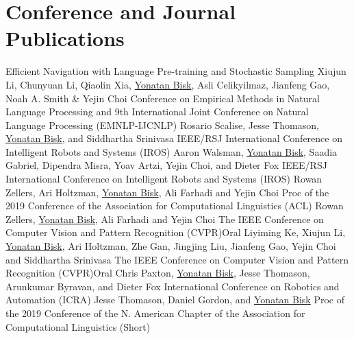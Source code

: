 \documentclass[10pt,letter]{moderncv}
\newcommand{\YB}{\underline{Yonatan Bisk}}
\begin{document}
\section{Conference and Journal Publications}
  {Efficient Navigation with Language Pre-training and Stochastic Sampling}
  {Xiujun Li, Chunyuan Li, Qiaolin Xia, \YB{}, Asli Celikyilmaz, Jianfeng Gao, Noah A. Smith \& Yejin Choi}
  {Conference on Empirical Methods in Natural Language Processing and 9th International Joint Conference on Natural Language Processing (EMNLP-IJCNLP)}{}{}
\pub{--}
  {\href{https://arxiv.org/abs/1904.01650}{\color{linkcolor}{Improving Robot Success Detection using Static Object Data}}}
  {Rosario Scalise, Jesse Thomason, \YB{}, and Siddhartha Srinivasa}
  {IEEE/RSJ International Conference on Intelligent Robots and Systems (IROS)}{}{}
\pub{--}
  {\href{https://arxiv.org/abs/1811.08824}{\color{linkcolor}{Early Fusion for Goal Directed Robotic Vision}}}
  {Aaron Walsman, \YB{}, Saadia Gabriel, Dipendra Misra, Yoav Artzi, Yejin Choi, and Dieter Fox}
  {IEEE/RSJ International Conference on Intelligent Robots and Systems (IROS)}{}{}
\pub{--}
  {\href{https://arxiv.org/abs/1905.07830}{\color{linkcolor}{HellaSwag: Can a Machine Really Finish Your Sentence?}}}
  {Rowan Zellers, Ari Holtzman, \YB{}, Ali Farhadi and Yejin Choi}
  {Proc of the 2019 Conference of the Association for Computational Linguistics (ACL)}{}{}
\pub{--}
  {\href{http://visualcommonsense.com/}{\color{linkcolor}{From Recognition to Cognition: Visual Commonsense Reasoning}}}
  {Rowan Zellers, \YB{}, Ali Farhadi and Yejin Choi}
  {The IEEE Conference on Computer Vision and Pattern Recognition (CVPR)}{Oral}{}
\pub{--}
  {\href{https://arxiv.org/abs/1903.02547}{\color{linkcolor}{Tactical Rewind: Self-Correction via Backtracking in Vision-and-Language Navigation}}}
  {Liyiming Ke, Xiujun Li, \YB{}, Ari Holtzman, Zhe Gan, Jingjing Liu, Jianfeng Gao, Yejin Choi and Siddhartha Srinivasa}
  {The IEEE Conference on Computer Vision and Pattern Recognition (CVPR)}{Oral}{}
\pub{--}
  {\href{https://arxiv.org/abs/1903.08309}{\color{linkcolor}{Prospection: Interpretable Plans From Language By Predicting the Future}}}
  {Chris Paxton, \YB{}, Jesse Thomason, Arunkumar Byravan, and Dieter Fox}
  {International Conference on Robotics and Automation (ICRA)}{}{}
\pub{--}
  {\href{https://arxiv.org/abs/1811.00613}{\color{linkcolor}{Shifting the Baseline: Single Modality Performance on Visual Navigation \& QA}}}
  {Jesse Thomason, Daniel Gordon, and \YB{}}
  {Proc of the 2019 Conference of the N. American Chapter of the Association for Computational Linguistics (Short)}{}{}
\end{document}
